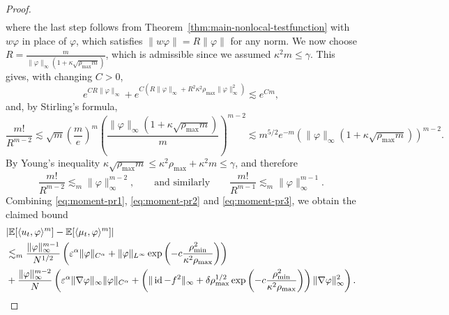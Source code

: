\documentclass[10pt,a4paper]{amsart}
\begin{document}
\begin{proof}
\begin{align}
\end{align}
where the last step follows from Theorem~\ref{thm:main-nonlocal-testfunction} with $w\varphi$ in place of $\varphi$, which satisfies $\|w\varphi\| = R \|\varphi\|$ for any norm. We now choose $R = \tfrac{m}{\|\varphi\|_\infty(1+\kappa\sqrt{\rho_{\max}m})}$, which is admissible since we assumed $\kappa^2 m \leq \gamma$. This gives, with changing $C>0$,
\begin{equation}\label{eq:moment-pr2}
    e^{C R\| \varphi \|_{\infty}} + e^{C (R\| \varphi \|_{\infty} + R^2\kappa^2 \rho_{\max}\| \varphi \|_{\infty}^2 )} \lesssim e^{C m},
\end{equation}
and, by Stirling's formula,
\[
    \frac{m!}{R^{m-2}} \lesssim \sqrt{m} \left(\frac{m}{e}\right)^m\left(\frac{\|\varphi\|_\infty(1+\kappa\sqrt{\rho_{\max}m})}{m}\right)^{m-2} \lesssim m^{5/2} e^{-m} (\|\varphi\|_\infty(1+\kappa\sqrt{\rho_{\max}m}))^{m-2}.
\]
By Young's inequality $\kappa \sqrt{\rho_{\max} m} \leq \kappa^2 \rho_{\max} + \kappa^2 m \leq \gamma$,   
and therefore
\begin{equation}\label{eq:moment-pr3}
    \frac{m!}{R^{m-2}} \lesssim_m \|\varphi\|_\infty^{m-2},\qquad \text{and similarly} \qquad \frac{m!}{R^{m-1}} \lesssim_m \|\varphi\|_\infty^{m-1}.
\end{equation}
Combining \eqref{eq:moment-pr1}, \eqref{eq:moment-pr2} and \eqref{eq:moment-pr3}, we obtain the claimed bound
\begin{align*}
  &| \mathbb{E} [\langle u_t, \varphi \rangle^m] -\mathbb{E} [\langle \mu_t,
  \varphi \rangle^m] | \\
    & \lesssim_m \frac{\|\varphi\|_\infty^{m-1}}{N^{1/2}} \left(\varepsilon^\alpha \|\varphi\|_{C^\alpha}
        + \|\varphi\|_{L^\infty} 
        \exp\left(-c \frac{\rho_{\min}^2}{\kappa^2\rho_{\max}}\right)\right)\\ \nonumber
    & + \frac{\|\varphi\|_\infty^{m-2}}{N} \left(\varepsilon^{\alpha} \|\nabla \varphi\|_\infty \| \varphi \|_{C^{\alpha}} + \left(\| \operatorname{id} - f^2 \|_{\infty} + \delta \rho_{\max}^{1/2} \exp\left(-c \frac{\rho_{\min}^2}{\kappa^2\rho_{\max}}\right)\right) \| \nabla \varphi \|_{\infty}^2\right). \qedhere
\end{align*}
\end{proof}
\end{document}

